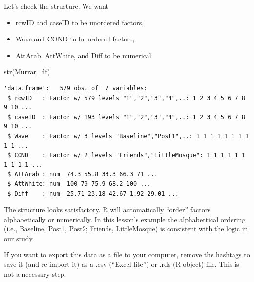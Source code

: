 \documentclass[
  11pt,
]{book}
\newenvironment{Shaded}{\begin{snugshade}}{\end{snugshade}}
\newcommand{\AttributeTok}[1]{\textcolor[rgb]{0.77,0.63,0.00}{#1}}
\newcommand{\CommentTok}[1]{\textcolor[rgb]{0.56,0.35,0.01}{\textit{#1}}}
\newcommand{\FunctionTok}[1]{\textcolor[rgb]{0.00,0.00,0.00}{#1}}
\newcommand{\NormalTok}[1]{#1}
\newcommand{\OtherTok}[1]{\textcolor[rgb]{0.56,0.35,0.01}{#1}}
\newcommand{\SpecialCharTok}[1]{\textcolor[rgb]{0.00,0.00,0.00}{#1}}
\newcommand{\StringTok}[1]{\textcolor[rgb]{0.31,0.60,0.02}{#1}}
\providecommand{\tightlist}{%
  \setlength{\itemsep}{0pt}\setlength{\parskip}{0pt}}
\begin{document}
\begin{Shaded}
\end{Shaded}

Let's check the structure. We want

\begin{itemize}
\tightlist
\item
  rowID and caseID to be unordered factors,
\item
  Wave and COND to be ordered factors,
\item
  AttArab, AttWhite, and Diff to be numerical
\end{itemize}

\begin{Shaded}
\begin{Highlighting}[]
\FunctionTok{str}\NormalTok{(Murrar\_df)}
\end{Highlighting}
\end{Shaded}

\begin{verbatim}
'data.frame':   579 obs. of  7 variables:
 $ rowID   : Factor w/ 579 levels "1","2","3","4",..: 1 2 3 4 5 6 7 8 9 10 ...
 $ caseID  : Factor w/ 193 levels "1","2","3","4",..: 1 2 3 4 5 6 7 8 9 10 ...
 $ Wave    : Factor w/ 3 levels "Baseline","Post1",..: 1 1 1 1 1 1 1 1 1 1 ...
 $ COND    : Factor w/ 2 levels "Friends","LittleMosque": 1 1 1 1 1 1 1 1 1 1 ...
 $ AttArab : num  74.3 55.8 33.3 66.3 71 ...
 $ AttWhite: num  100 79 75.9 68.2 100 ...
 $ Diff    : num  25.71 23.18 42.67 1.92 29.01 ...
\end{verbatim}

The structure looks satisfactory. R will automatically ``order'' factors alphabetically or numerically. In this lesson's example the alphabettical ordering (i.e., Baseline, Post1, Post2; Friends, LittleMosque) is consistent with the logic in our study.

If you want to export this data as a file to your computer, remove the hashtags to save it (and re-import it) as a .csv (``Excel lite'') or .rds (R object) file. This is not a necessary step.
\end{document}
